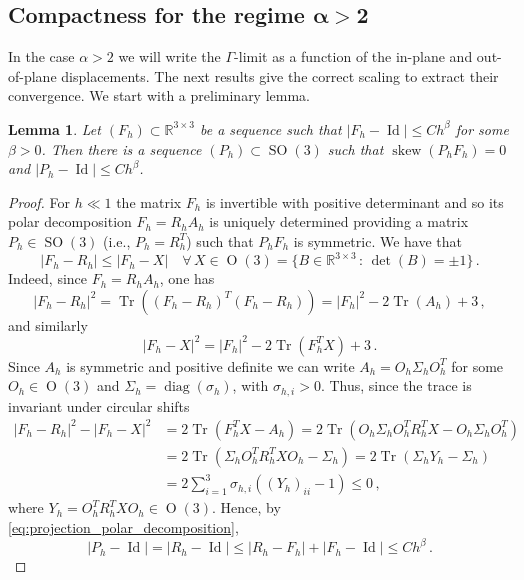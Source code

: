 \documentclass{article}
\theoremstyle{plain}
\theoremstyle{plain}
\theoremstyle{plain}
\newtheorem{lemma}[teo]{Lemma}
\theoremstyle{plain}
\theoremstyle{plain}
\theoremstyle{definition}
\theoremstyle{definition}
\renewcommand{\r}{\mathbb{R}}
\DeclareMathOperator{\Id}{Id}
\DeclareMathOperator{\SO}{SO}
\DeclareMathOperator{\Ort}{O}
\DeclareMathOperator{\skw}{skew}
\DeclareMathOperator{\diag}{diag}
\DeclareMathOperator{\Tr}{Tr}
\begin{document}
\subsection{Compactness for the regime \texorpdfstring{$\bm{\alpha > 2}$}{ > 2}}

In the case $\alpha > 2$ we will write the $\Gamma$-limit as a function of the in-plane and out-of-plane displacements. The next results give the correct scaling to extract their convergence. We start with a preliminary lemma.

\begin{lemma}\label{lemma:rotation_to_skew_matrix}
    Let $(F_h) \subset \r^{3 \times 3}$ be a sequence such that $|F_h - \Id| \leq Ch^\beta$ for some $\beta > 0$. Then there is a sequence $(P_h) \subset \SO(3)$ such that $\skw(P_h F_h) = 0$ and $|P_h - \Id| \leq Ch^\beta$.
\end{lemma}

\begin{proof}
For $h \ll 1$ the matrix $F_h$ is invertible with positive determinant and so its polar decomposition $F_h = R_h A_h$ is uniquely determined providing a matrix $P_h \in \SO(3)$ (i.e., $P_h = R_h^T$) such that $P_h F_h$ is symmetric. We have that 
\begin{equation}\label{eq:projection_polar_decomposition}
    |F_h - R_h| \leq |F_h - X| \quad \forall \, X \in \Ort(3) = \{B \in \r^{3 \times 3} \, : \, \det(B) = \pm 1 \} \,.
\end{equation}
Indeed, since $F_h = R_h A_h$, one has
\begin{equation}
    |F_h  - R_h|^2 = \Tr((F_h - R_h)^T(F_h - R_h)) = |F_h|^2 - 2\Tr(A_h) + 3\,,
\end{equation}
and similarly
\begin{equation}
    |F_h  - X|^2 = |F_h|^2 - 2\Tr(F_h^T X) + 3\,.
\end{equation}
Since $A_h$ is symmetric and positive definite we can write $A_h = O_h\Sigma_hO_h^T$ for some $O_h \in \Ort(3)$ and $\Sigma_h = \diag(\sigma_{h})$, with $\sigma_{h, i} > 0$. Thus, since the trace is invariant under circular shifts
\begin{align}
    |F_h  - R_h|^2 - |F_h  - X|^2 & = 2\Tr(F_h^T X - A_h) = 2\Tr(O_h \Sigma_h O_h^T R_h^T X - O_h \Sigma_h O_h^T) \\
    & = 2\Tr(\Sigma_h O_h^T R_h^T X O_h - \Sigma_h) = 2 \Tr(\Sigma_h Y_h - \Sigma_h) \\
    & = 2\sum_{i=1}^3 \sigma_{h, i}((Y_h)_{ii} - 1) \leq 0\,,
\end{align}
where $Y_h = O_h^T R_h^T X O_h \in \Ort(3)$.
Hence, by \eqref{eq:projection_polar_decomposition},
\[
    |P_h - \Id| = |R_h - \Id| \leq |R_h - F_h| + |F_h - \Id| \leq Ch^\beta \,.
\]
\end{proof}
\end{document}

